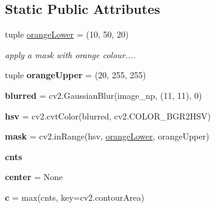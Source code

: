 \subsection*{Static Public Attributes}
\begin{DoxyCompactItemize}
\item 
tuple \hyperlink{classexample__ball_1_1image__feature_a718a0d65946dc0ee6c9cedf4072f0d27}{orange\+Lower} = (10, 50, 20)
\begin{DoxyCompactList}\small\item\em apply a mask with orange colour.... \end{DoxyCompactList}\item 
\mbox{\label{classexample__ball_1_1image__feature_a79f7ff06d01d027de728e5dde0ee7715}} 
tuple {\bfseries orange\+Upper} = (20, 255, 255)
\item 
\mbox{\label{classexample__ball_1_1image__feature_a4d8f88e4df7c74264943d12368d044b5}} 
{\bfseries blurred} = cv2.\+Gaussian\+Blur(image\+\_\+np, (11, 11), 0)
\item 
\mbox{\label{classexample__ball_1_1image__feature_a0eb718a3f14703cdbd27e01c7cacbd27}} 
{\bfseries hsv} = cv2.\+cvt\+Color(blurred, cv2.\+C\+O\+L\+O\+R\+\_\+\+B\+G\+R2\+H\+SV)
\item 
\mbox{\label{classexample__ball_1_1image__feature_a18461271e7df77848b8a3869e29ad3c6}} 
{\bfseries mask} = cv2.\+in\+Range(hsv, \hyperlink{classexample__ball_1_1image__feature_a718a0d65946dc0ee6c9cedf4072f0d27}{orange\+Lower}, orange\+Upper)
\item 
{\bfseries cnts}
\item 
\mbox{\label{classexample__ball_1_1image__feature_aa4f16610818697c6aa0eb85a802ee728}} 
{\bfseries center} = None
\item 
\mbox{\label{classexample__ball_1_1image__feature_ac5cdfaff261d46754b26ceab37554652}} 
{\bfseries c} = max(cnts, key=cv2.\+contour\+Area)
\item 
\mbox{\label{classexample__ball_1_1image__feature_a456b3f452474185dc35e4fe5e21ffaf8}} 

\end{DoxyCompactItemize}
